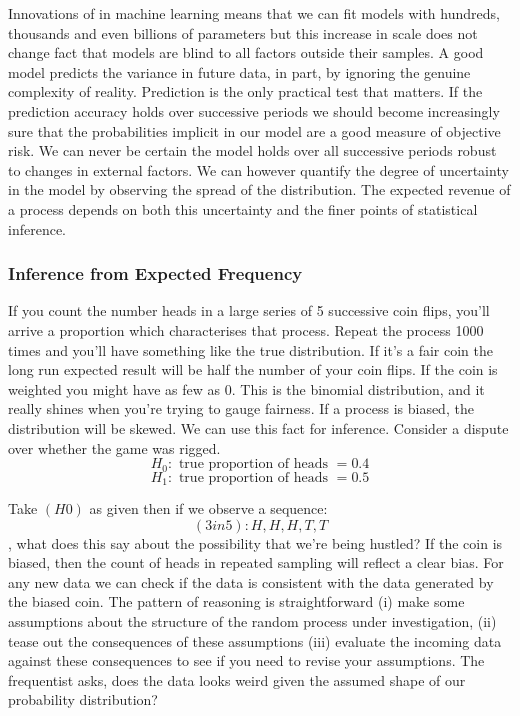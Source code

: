 \documentclass[10pt,a4paper,notitlepage, twocolumn]{article}
\begin{document}
Innovations of in machine learning means that we can fit models with hundreds, thousands and even billions of parameters but this increase in scale does not change fact that models are blind to all factors outside their samples. A good model predicts the variance in future data, in part, by ignoring the genuine complexity of reality. Prediction is the only practical test that matters. If the prediction accuracy holds over successive periods we should become increasingly sure that the probabilities implicit in our model are a good measure of objective risk. We can never be certain the model holds over all successive periods robust to changes in external factors. We can however quantify the degree of uncertainty in the model by observing the spread of the distribution. The expected revenue of a process depends on both this uncertainty and the finer points of statistical inference. 

\subsubsection*{Inference from Expected Frequency}
If you count the number heads in a large series of 5 successive coin flips, you'll arrive a proportion which characterises that process. Repeat the process 1000 times and you'll have something like the true distribution. If it's a fair coin the long run expected result will be half the number of your coin flips. If the coin is weighted you might have as few as 0. This is the binomial distribution, and it really shines when you're trying to gauge fairness. If a process is biased, the distribution will be skewed. We can use this fact for inference. Consider a dispute over whether the game was rigged. 
$$ H_0 : \text{ true proportion of heads } = 0.4  $$
$$ H_1 : \text{ true proportion of heads } =  0.5 $$

\noindent Take $(H0)$ as given then if we observe a sequence: $$ (3in5): H, H, H, T, T$$, what does this say about the possibility that we're being hustled? If the coin is biased, then the count of heads in repeated sampling will reflect a clear bias. For any new data we can check if the data is consistent with the data generated by the biased coin. The pattern of reasoning is straightforward (i) make some assumptions about the structure of the random process under investigation, (ii) tease out the consequences of these assumptions (iii) evaluate the incoming data against these consequences to see if you need to revise your assumptions. The frequentist asks, does the data looks weird given the assumed shape of our probability distribution?
\end{document}
